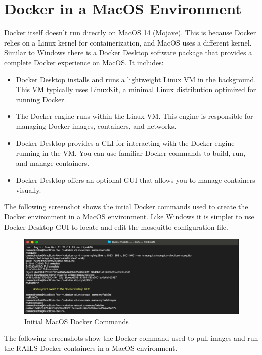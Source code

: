 \section{Docker in a MacOS Environment}
\label{sec:mac-cmds}
Docker itself doesn't run directly on MacOS 14 (Mojave). This is because Docker relies on a Linux kernel for containerization, and MacOS uses a different kernel. 
Similar to Windows there is a Docker Desktop software package that provides a complete Docker experience on MacOS. It includes:
\begin{itemize}
\item Docker Desktop installs and runs a lightweight Linux \ac{VM} in the background. This  \ac{VM} typically uses LinuxKit, a minimal Linux distribution optimized for running Docker.
\item The Docker engine runs within the Linux \ac{VM}. This engine is responsible for managing Docker images, containers, and networks.
\item Docker Desktop provides a \ac{CLI} for interacting with the Docker engine running in the VM. You can use familiar Docker commands to build, run, and manage containers.
\item Docker Desktop offers an optional GUI that allows you to manage containers visually.
\end{itemize}
The following screenshot shows the intial Docker commands used to create the Docker environment in a MacOS environment. Like Windows it is simpler to use Docker Desktop \ac{GUI} to locate and edit the mosquitto configuration file.
\begin{figure}[H]
    \centering
    \includegraphics[scale=0.5]{win1m.png}
    \caption{Initial MacOS Docker Commands}
    \label{fig:mac-docker-cmds}
\end{figure}
The following screenshots show the Docker command used to pull images and run the \ac{RAILS} Docker containers in a MacOS environment.
